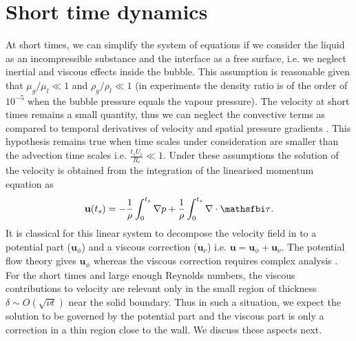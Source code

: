 \documentclass[final]{jfm}
\begin{document}
\section{Short time dynamics}

At short times, we can simplify the system of equations if we consider the liquid as an incompressible substance and the interface as a free surface, i.e. we neglect inertial and viscous effects inside the bubble. This assumption is reasonable given that $\mu_g/\mu_l \ll 1$ and $\rho_g/\rho_l \ll 1$ (in experiments the density ratio is of the order of $10^{-5}$ when the bubble pressure equals the vapour pressure). The velocity at short times remains a small quantity, thus we can neglect the convective terms as compared to temporal derivatives of velocity and spatial pressure gradients \citep{batchelor2000}. This hypothesis remains true when time scales under consideration are smaller than the advection time scales i.e. $\frac{t_s U_c}{R_c}\ll 1$.
Under these assumptions the solution of the velocity is obtained from the integration of the linearised momentum equation as
\begin{equation}
{\mathbf u}(t_s) =  - \frac{1}{\rho} \int_0^{t_s} \nabla p + \frac{1}{\rho} \int_0^{t_s} \nabla \cdot {\mathsfbi \tau}.
\label{eq:momsmalltimes}
\end{equation}
It is classical for this linear system to decompose the velocity field in to a potential part (${\mathbf u}_\phi$) and a viscous correction (${\mathbf u}_\nu$) i.e. ${\mathbf u} =  {\mathbf u}_{\phi} + {\mathbf u}_{\nu}$. The potential flow theory gives ${\mathbf u}_\phi$ whereas the viscous correction requires complex analysis \citep{saffman1995vortex,batchelor2000,pope2001turbulent}. For the short times and large enough Reynolds numbers, the viscous contributions to velocity are relevant only in the small region of thickness $\delta \sim \textit{O} (\sqrt{\nu t})$ near the solid boundary. Thus in such a situation, we expect the solution to be governed by the potential part and the viscous part is only a correction in a thin region close to the wall. We discuss these aspects next.
\end{document}
